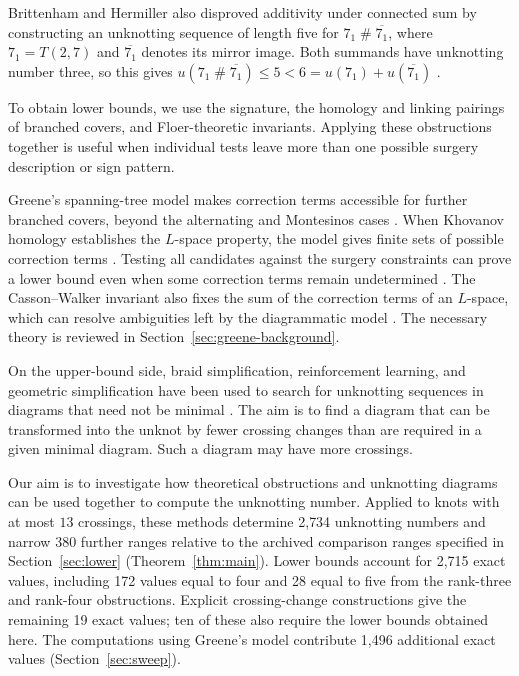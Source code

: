 \documentclass[12pt, oneside]{amsart}
\newcommand{\nExactUpper}{19}
\newcommand{\nExact}{2{,}734}
\newcommand{\nExactLower}{2{,}715}
\newcommand{\nImproved}{380}
\newcommand{\nSweepNewExact}{1{,}496}
\newcommand{\nUfive}{28}
\newcommand{\nUfour}{172}
\begin{document}
Brittenham and Hermiller also disproved additivity under connected sum by
constructing an unknotting sequence of length five for
$7_1\mathbin{\#}\overline{7_1}$, where $7_1=T(2,7)$ and
$\overline{7_1}$ denotes its mirror image. Both summands have unknotting
number three, so this gives
$u(7_1\mathbin{\#}\overline{7_1})\le5<6=u(7_1)+u(\overline{7_1})$
\cite[Thm.~1.2]{BHadd}.

To obtain lower bounds, we use the signature, the homology and linking
pairings of branched covers, and Floer-theoretic invariants. Applying these
obstructions together is useful when individual tests leave more than one
possible surgery description or sign pattern.

Greene's spanning-tree model makes correction terms accessible for further
branched covers, beyond the alternating and Montesinos cases \cite{Greene}.
When Khovanov homology establishes the $L$-space property, the model gives
finite sets of possible correction terms \cite{OSbranched,Greene}.
Testing all candidates against the surgery constraints can prove a lower bound
even when some correction terms remain undetermined \cite{Owens,NiWu}.
The Casson--Walker invariant also fixes the sum of the correction terms of an
$L$-space, which can resolve ambiguities left by the diagrammatic model
\cite{Rustamov,GreeneWatson}.
The necessary theory is reviewed in Section~\ref{sec:greene-background}.

On the upper-bound side, braid simplification, reinforcement learning, and geometric
simplification have been used to search for unknotting sequences in diagrams that
need not be minimal \cite{GukovUnknot,Applebaum,DKT,ReAPR}. The aim is to find a
diagram that can be transformed into the unknot by fewer crossing changes than are
required in a given minimal diagram. Such a diagram may have more crossings.

Our aim is to investigate how theoretical obstructions and unknotting diagrams
can be used together to compute the unknotting number.
Applied to knots with at most $13$ crossings, these methods determine \nExact{}
unknotting numbers and narrow \nImproved{} further ranges relative to the
archived comparison ranges specified in Section~\ref{sec:lower}
(Theorem~\ref{thm:main}). Lower bounds account for
\nExactLower{} exact values, including \nUfour{} values equal to four and
\nUfive{} equal to five from the rank-three and rank-four obstructions.
Explicit crossing-change constructions give the remaining \nExactUpper{}
exact values; ten of these also require the lower bounds obtained here. The computations using Greene's model contribute
\nSweepNewExact{} additional exact values (Section~\ref{sec:sweep}).
\end{document}
